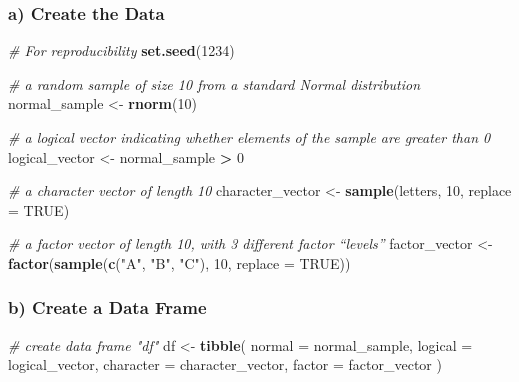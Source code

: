 \documentclass[
]{article}
\newenvironment{Shaded}{\begin{snugshade}}{\end{snugshade}}
\newcommand{\AttributeTok}[1]{\textcolor[rgb]{0.13,0.29,0.53}{#1}}
\newcommand{\CommentTok}[1]{\textcolor[rgb]{0.56,0.35,0.01}{\textit{#1}}}
\newcommand{\ConstantTok}[1]{\textcolor[rgb]{0.56,0.35,0.01}{#1}}
\newcommand{\DecValTok}[1]{\textcolor[rgb]{0.00,0.00,0.81}{#1}}
\newcommand{\FunctionTok}[1]{\textcolor[rgb]{0.13,0.29,0.53}{\textbf{#1}}}
\newcommand{\NormalTok}[1]{#1}
\newcommand{\OtherTok}[1]{\textcolor[rgb]{0.56,0.35,0.01}{#1}}
\newcommand{\SpecialCharTok}[1]{\textcolor[rgb]{0.81,0.36,0.00}{\textbf{#1}}}
\newcommand{\StringTok}[1]{\textcolor[rgb]{0.31,0.60,0.02}{#1}}
\begin{document}
\subsubsection{a) Create the Data}\label{a-create-the-data}

\begin{Shaded}
\begin{Highlighting}[]
\CommentTok{\# For reproducibility}
\FunctionTok{set.seed}\NormalTok{(}\DecValTok{1234}\NormalTok{)}

\CommentTok{\# a random sample of size 10 from a standard Normal distribution}
\NormalTok{normal\_sample }\OtherTok{\textless{}{-}} \FunctionTok{rnorm}\NormalTok{(}\DecValTok{10}\NormalTok{)}

\CommentTok{\# a logical vector indicating whether elements of the sample are greater than 0}
\NormalTok{logical\_vector }\OtherTok{\textless{}{-}}\NormalTok{ normal\_sample }\SpecialCharTok{\textgreater{}} \DecValTok{0}

\CommentTok{\# a character vector of length 10}
\NormalTok{character\_vector }\OtherTok{\textless{}{-}} \FunctionTok{sample}\NormalTok{(letters, }\DecValTok{10}\NormalTok{, }\AttributeTok{replace =} \ConstantTok{TRUE}\NormalTok{)}

\CommentTok{\# a factor vector of length 10, with 3 different factor “levels”}
\NormalTok{factor\_vector }\OtherTok{\textless{}{-}} \FunctionTok{factor}\NormalTok{(}\FunctionTok{sample}\NormalTok{(}\FunctionTok{c}\NormalTok{(}\StringTok{"A"}\NormalTok{, }\StringTok{"B"}\NormalTok{, }\StringTok{"C"}\NormalTok{), }\DecValTok{10}\NormalTok{, }\AttributeTok{replace =} \ConstantTok{TRUE}\NormalTok{))}
\end{Highlighting}
\end{Shaded}

\subsubsection{b) Create a Data Frame}\label{b-create-a-data-frame}

\begin{Shaded}
\begin{Highlighting}[]
\CommentTok{\# create data frame "df"}
\NormalTok{df }\OtherTok{\textless{}{-}} \FunctionTok{tibble}\NormalTok{(}
  \AttributeTok{normal =}\NormalTok{ normal\_sample,}
  \AttributeTok{logical =}\NormalTok{ logical\_vector,}
  \AttributeTok{character =}\NormalTok{ character\_vector,}
  \AttributeTok{factor =}\NormalTok{ factor\_vector}
\NormalTok{)}
\end{Highlighting}
\end{Shaded}
\end{document}
